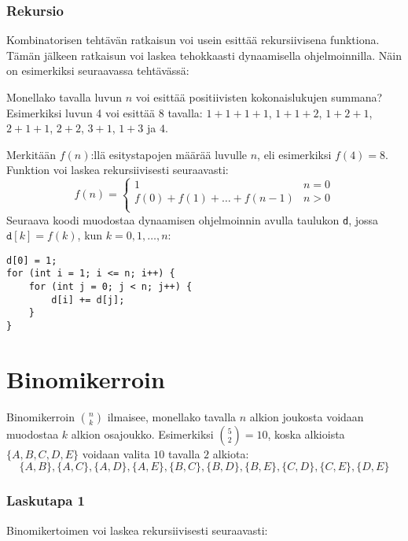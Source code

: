 \subsubsection{Rekursio}

Kombinatorisen tehtävän ratkaisun voi usein esittää
rekursiivisena funktiona.
Tämän jälkeen ratkaisun voi laskea tehokkaasti
dynaamisella ohjelmoinnilla.
Näin on esimerkiksi seuraavassa tehtävässä:

\begin{task}
Monellako tavalla luvun $n$ voi esittää positiivisten
kokonaislukujen summana?
Esimerkiksi luvun 4 voi esittää 8 tavalla:
$1+1+1+1$, $1+1+2$, $1+2+1$, $2+1+1$,
$2+2$, $3+1$, $1+3$ ja $4$.
\end{task}

Merkitään $f(n)$:llä esitystapojen määrää luvulle $n$,
eli esimerkiksi $f(4)=8$.
Funktion voi laskea rekursiivisesti seuraavasti:
\begin{equation*}
    f(n) = \begin{cases}
               1               & n = 0\\
               f(0)+f(1)+\ldots+f(n-1) & n > 0\\
           \end{cases}
\end{equation*}
Seuraava koodi muodostaa dynaamisen ohjelmoinnin avulla
taulukon \texttt{d}, jossa $\texttt{d}[k]=f(k)$,
kun $k=0,1,\ldots,n$:
\begin{lstlisting}
d[0] = 1;
for (int i = 1; i <= n; i++) {
    for (int j = 0; j < n; j++) {
        d[i] += d[j];
    }
}
\end{lstlisting}

\section{Binomikerroin}

Binomikerroin ${n \choose k}$ ilmaisee,
monellako tavalla $n$ alkion joukosta
voidaan muodostaa $k$ alkion osajoukko.
Esimerkiksi ${5 \choose 2}=10$,
koska alkioista $\{A,B,C,D,E\}$
voidaan valita $10$ tavalla $2$ alkiota:
\[ \{A,B\}, \{A,C\}, \{A,D\}, \{A,E\}, \{B,C\}, 
\{B,D\}, \{B,E\}, \{C,D\}, \{C,E\}, \{D,E\} \]

\subsubsection{Laskutapa 1}

Binomikertoimen voi laskea rekursiivisesti seuraavasti:

